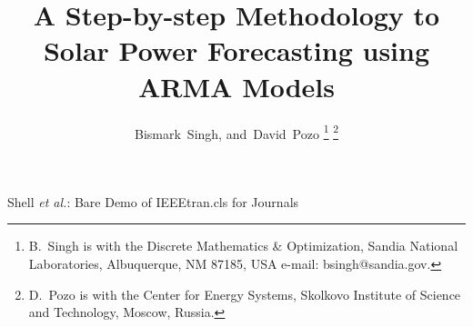 \documentclass[letter]{IEEEtran}
\begin{document}
%
\title{A Step-by-step Methodology to Solar Power Forecasting using ARMA 
Models}
%
%
%

\author{Bismark~Singh, and~David~Pozo%
\thanks{B.~Singh is with the Discrete Mathematics \& Optimization, Sandia 
National Laboratories, Albuquerque, NM 87185, USA
e-mail: bsingh@sandia.gov.}%
\thanks{D.~Pozo is with the Center for Energy Systems, Skolkovo Institute of 
Science and Technology, Moscow, Russia.}}%

% 
%



%
{Shell \MakeLowercase{\textit{et al.}}: Bare Demo of IEEEtran.cls for Journals}
% 
\end{document}

